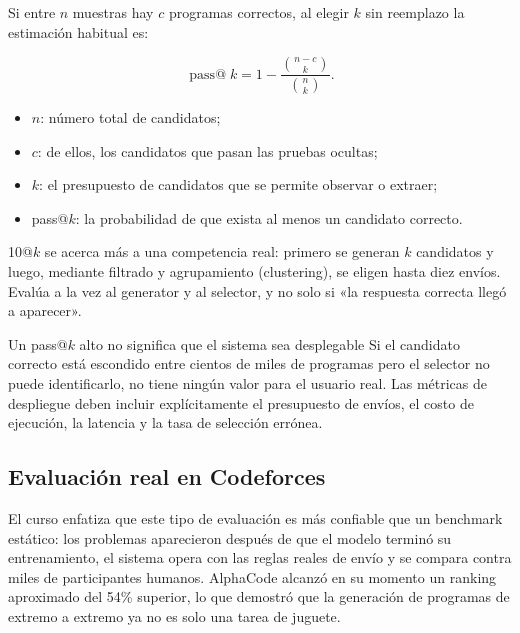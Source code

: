 \documentclass[a4paper]{article}
\begin{document}
Si entre $n$ muestras hay $c$ programas correctos, al elegir $k$ sin reemplazo la estimación habitual es:

$$
\operatorname{pass@}k=1-\frac{\binom{n-c}{k}}{\binom{n}{k}}.
$$

\begin{itemize}
    \item $n$: número total de candidatos;
    \item $c$: de ellos, los candidatos que pasan las pruebas ocultas;
    \item $k$: el presupuesto de candidatos que se permite observar o extraer;
    \item pass@$k$: la probabilidad de que exista al menos un candidato correcto.
\end{itemize}

10@$k$ se acerca más a una competencia real: primero se generan $k$ candidatos y luego, mediante filtrado y agrupamiento (clustering), se eligen hasta diez envíos. Evalúa a la vez al generator y al selector, y no solo si «la respuesta correcta llegó a aparecer».


\begin{warningbox}{Un pass@$k$ alto no significa que el sistema sea desplegable}
Si el candidato correcto está escondido entre cientos de miles de programas pero el selector no puede identificarlo, no tiene ningún valor para el usuario real. Las métricas de despliegue deben incluir explícitamente el presupuesto de envíos, el costo de ejecución, la latencia y la tasa de selección errónea.
\end{warningbox}

\subsection{Evaluación real en Codeforces}


El curso enfatiza que este tipo de evaluación es más confiable que un benchmark estático: los problemas aparecieron después de que el modelo terminó su entrenamiento, el sistema opera con las reglas reales de envío y se compara contra miles de participantes humanos. AlphaCode alcanzó en su momento un ranking aproximado del 54\% superior, lo que demostró que la generación de programas de extremo a extremo ya no es solo una tarea de juguete.
\end{document}
